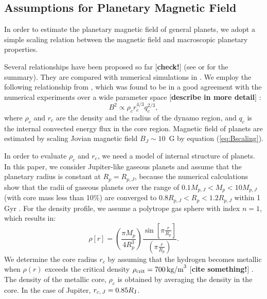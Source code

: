 \documentclass{emulateapj}
\def\memoYF#1{\color{red}$[${\bf #1}$]$ \color{black}}
\begin{document}
\subsection{Assumptions for Planetary Magnetic Field}
\label{ss:magneticfield}

In order to estimate the planetary magnetic field of general planets, we adopt a simple scaling relation between the magnetic field and macroscopic planetary properties. 

Several relationships have been proposed so far \citep[e.g.][]{russel1978,busse1976,stevenson1979,mizutani1992,sano1993,starchenko2002,christensen2006} \memoYF{check!} (see \citet{griebmeier2004} or \citet{christensen2010} for the summary). 
%
They are compared with numerical simulations in \citet{christensen2010}. We employ the following relationship from \citet{christensen2006}, which was found to be in a good agreement with the numerical experiments over a wide parameter space \memoYF{describe in more detail}:
\begin{equation}
B^2 \propto \rho_c r_c^{4/3} q_c^{2/3}, \label{eq:Bscaling} %
\end{equation}
where $\rho _c$ and $r_c$ are the density and the radius of the dynamo region, and $q_c$ is the internal convected energy flux in the core region. 
Magnetic field of planets are estimated by scaling Jovian magnetic field $B_J \sim 10$~G by equation (\ref{eq:Bscaling}). 

In order to evaluate $\rho _c $ and $r_c$, we need a model of internal structure of planets. 
In this paper, we consider Jupiter-like gaseous planets and assume that the planetary radius is constant at $R_p = R_{p,J}$, because the numerical calculations show that the radii of gaseous planets over the range of $0.1 M_{p, J} < M_p < 10M_{p, J}$ (with core mass less than 10\%) are converged to $0.8 R_{p, J} < R_p < 1.2R_{p, J}$ within 1 Gyr \citep{fortney2007}. 
For the density profile, we assume a polytrope gas sphere with index $n=1$, which results in:
\begin{equation}
\rho [r] = \left( \frac{\pi M_p}{4 R_p^3} \right) \frac{\sin \left[ \pi \frac{r}{R_p} \right]}{\left( \pi \frac{r}{R_p} \right)}. \label{eq:rho_r}
\end{equation}
We determine the core radius $r_c$ by assuming that the hydrogen becomes metallic when $\rho (r)$ exceeds the critical density $\rho_{\rm crit}=700\,\mbox{kg/m}^3$ \memoYF{cite something!}. The density of the metallic core, $\rho _c$ is obtained by averaging the density in the core. 
In the case of Jupiter, $r_{c,\,J} = 0.85 R_{\rm J}$. 
\end{document}
